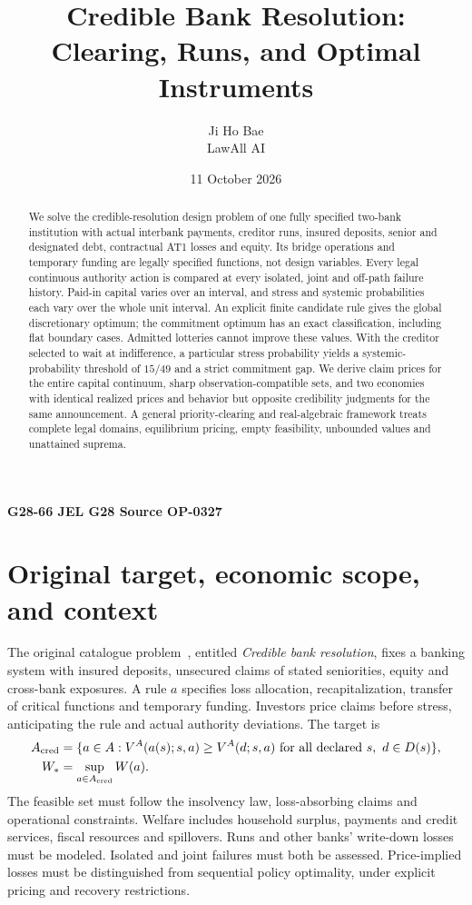 \documentclass[11pt,a4paper]{article}
\title{Credible Bank Resolution:\\Clearing, Runs, and Optimal Instruments}
\author{Ji Ho Bae\\\small LawAll AI}
\date{11 October 2026}
\numberwithin{equation}{section}
\theoremstyle{definition}
\begin{document}
\maketitle
\begin{center}
\small\textbf{G28-66 \quad JEL G28 \quad Source OP-0327}
\end{center}
\begin{abstract}
We solve the credible-resolution design problem of one fully specified
two-bank institution with actual interbank payments, creditor runs, insured
deposits, senior and designated debt, contractual AT1 losses and equity. Its
bridge operations and temporary funding are legally specified functions, not
design variables. Every legal continuous authority action is compared
at every isolated, joint and off-path failure history. Paid-in capital varies
over an interval, and stress and systemic probabilities each vary over the
whole unit interval. An explicit finite candidate rule gives the global
discretionary optimum; the commitment optimum has an exact classification,
including flat boundary cases. Admitted lotteries cannot improve these
values. With the creditor selected to wait at indifference, a particular
stress probability yields a systemic-probability threshold of \(15/49\) and
a strict commitment gap. We derive claim prices
for the entire capital continuum, sharp observation-compatible sets, and
two economies with identical realized prices and behavior but opposite
credibility judgments for the same announcement. A general priority-clearing
and real-algebraic framework treats complete legal domains, equilibrium
pricing, empty feasibility, unbounded values and unattained suprema.
\end{abstract}

\section{Original target, economic scope, and context}\label{sec:target}

The original catalogue problem~\cite{catalogue}, entitled \emph{Credible
bank resolution}, fixes a banking system with insured deposits, unsecured
claims of stated seniorities, equity and cross-bank exposures. A rule
\(a\) specifies loss allocation, recapitalization, transfer of critical
functions and temporary funding. Investors price claims before stress,
anticipating the rule and actual authority deviations. The target is
\begin{equation}\label{eq:original}
\begin{split}
A_{\rm cred}
 &=\{a\in A:V^A(a(s);s,a)\ge V^A(d;s,a)
                \text{ for all declared }s,\ d\in D(s)\},\\
W_*&=\sup_{a\in A_{\rm cred}}W(a).
\end{split}
\end{equation}
The feasible set must follow the insolvency law, loss-absorbing claims and
operational constraints. Welfare includes household surplus, payments and
credit services, fiscal resources and spillovers. Runs and other banks'
write-down losses must be modeled. Isolated and joint failures must both
be assessed. Price-implied losses must be distinguished from sequential
policy optimality, under explicit pricing and recovery restrictions.
\end{document}
